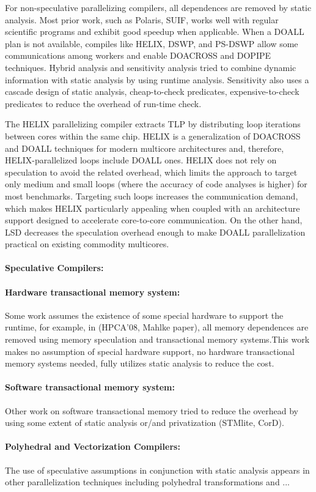 For non-speculative parallelizing compilers, all dependences are removed by
static analysis. Most prior work, such as Polaris, SUIF, works well with regular
scientific programs and exhibit good speedup when applicable. When a DOALL plan
is not available, compiles like HELIX, DSWP, and PS-DSWP allow some
communications among workers and enable DOACROSS and DOPIPE techniques. Hybrid
analysis and sensitivity analysis tried to combine dynamic information with
static analysis by using runtime analysis. Sensitivity also uses a cascade
design of static analysis, cheap-to-check predicates, expensive-to-check
predicates to reduce the overhead of run-time check.


The HELIX parallelizing compiler extracts TLP by distributing loop iterations between cores within the same chip.
HELIX is a generalization of DOACROSS and DOALL techniques for modern multicore architectures and, therefore, HELIX-parallelized loops include DOALL ones.
HELIX does not rely on speculation to avoid the related overhead, which limits the approach to target only medium and small loops (where the accuracy of code analyses is higher) for most benchmarks.
Targeting such loops increases the communication demand, which makes HELIX particularly appealing when coupled with an architecture support designed to accelerate core-to-core communication.
On the other hand, LSD decreases the speculation overhead enough to make DOALL parallelization practical on existing commodity multicores.


\paragraph{Speculative Compilers:}

\paragraph{Hardware transactional memory system:}

Some work assumes the existence of some special hardware to support the runtime,
for example, in (HPCA’08, Mahlke paper), all memory dependences are removed
using memory speculation and transactional memory systems.This work makes no
assumption of special hardware support, no hardware transactional memory systems
needed, fully utilizes static analysis to reduce the cost.

\paragraph{Software transactional memory system:}

Other work on software transactional memory tried to reduce the overhead by
using some extent of static analysis or/and privatization (STMlite, CorD).

\paragraph{Polyhedral and Vectorization Compilers:}

The use of speculative assumptions in conjunction with static analysis appears
in other parallelization techniques including polyhedral transformations and ...